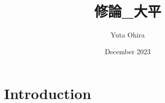 \documentclass{article}
\title{修論_大平}
\author{Yuta Ohira}
\date{December 2023}
\begin{document}
\maketitle

\section{Introduction}
\end{document}
